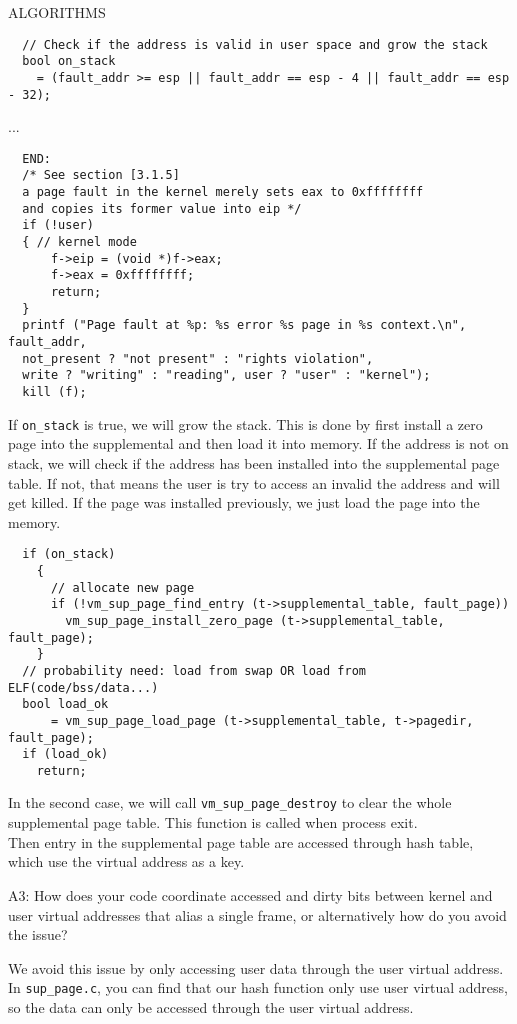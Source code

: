 \begin{aspect}{ALGORITHMS}
\begin{lstlisting}
  // Check if the address is valid in user space and grow the stack
  bool on_stack
    = (fault_addr >= esp || fault_addr == esp - 4 || fault_addr == esp - 32);
  \end{lstlisting}
  ...
  \begin{lstlisting}
  END:
  /* See section [3.1.5]
  a page fault in the kernel merely sets eax to 0xffffffff
  and copies its former value into eip */
  if (!user)
  { // kernel mode
      f->eip = (void *)f->eax;
      f->eax = 0xffffffff;
      return;
  }
  printf ("Page fault at %p: %s error %s page in %s context.\n", fault_addr,
  not_present ? "not present" : "rights violation",
  write ? "writing" : "reading", user ? "user" : "kernel");
  kill (f);
  \end{lstlisting}
  If \texttt{on\_stack} is true, we will grow the stack. This is done by first install a zero page into the supplemental and then load it into memory. If the address is not on stack, we will check if the address has been installed into the supplemental page table. If not, that means the user is try to access an invalid the address and will get killed. If the page was installed previously, we just load the page into the memory.
  \begin{lstlisting}
  if (on_stack)
    {
      // allocate new page
      if (!vm_sup_page_find_entry (t->supplemental_table, fault_page))
        vm_sup_page_install_zero_page (t->supplemental_table, fault_page);
    }
  // probability need: load from swap OR load from ELF(code/bss/data...)
  bool load_ok
      = vm_sup_page_load_page (t->supplemental_table, t->pagedir, fault_page);
  if (load_ok)
    return;
\end{lstlisting}
  In the second case, we will call \texttt{vm\_sup\_page\_destroy} to clear the whole supplemental page table. This function is called when process exit.\\
  Then entry in the supplemental page table are accessed through hash table, which use the virtual address as a key.
  \begin{qc}
    A3: How does your code coordinate accessed and dirty bits between kernel and user virtual addresses
    that alias a single frame,
    or alternatively how do you avoid the issue?
  \end{qc}
  We avoid this issue by only accessing user data through the user virtual address. In \texttt{sup\_page.c}, you can find that our hash function only use user virtual address, so the data can only be accessed through the user virtual address.\\
\end{aspect}

